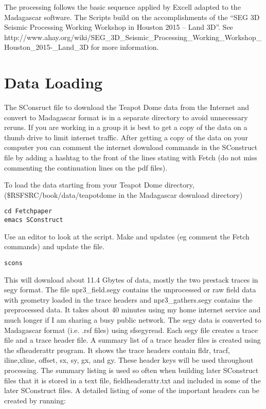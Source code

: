 The processing follows the basic sequence applied by Excell adapted to the Madagascar software.  The Scripts build on the accomplishments of the “SEG 3D Seismic Processing Working Workshop in Houston 2015 – Land 3D”.  See http://www.ahay.org/wiki/SEG\_3D\_Seismic\_Processing\_Working\_Workshop\_Houston\_2015-\_Land\_3D for more information.

\section{Data Loading}
The SConsruct file to download the Teapot Dome data from the Internet and convert to Madagascar format is in a separate directory to avoid unnecessary reruns.  If you are working in a group it is best to get a copy of the data on a thumb drive to limit internet traffic.  After getting a copy of the data on your computer you can comment the internet download commands in the SConstruct file by adding a hashtag to the front of the lines stating with Fetch (do not miss commenting the continuation lines on the pdf files).

To load the data starting from your Teapot Dome directory, (\$RSFSRC/book/data/teapotdome in the Madagascar download directory)

\begin{verbatim}
cd Fetchpaper
emacs SConstruct
\end{verbatim}  

Use an editor to look at the script.  Make and updates (eg comment the Fetch
commands) and update the file.

\begin{verbatim}
scons 
\end{verbatim}  

This will download about 11.4 Gbytes of data, mostly the two prestack traces in segy format.  The file npr3\_field.segy contains the unprocessed or raw field data with geometry loaded in the trace headers and npr3\_gathers.segy contains the preprocessed data.  It takes about 40 minutes using my home internet service and much longer if I am sharing a busy public network.   The segy data is converted to Madagascar format (i.e. .rsf files) using sfsegyread.  Each segy file creates a trace file and a trace header file.  A summary list of a trace header files is created using the sfheaderattr program.  It shows the trace headers contain fldr, tracf, iline,xline, offset, sx, sy, gx, and gy.  These header keys will be used throughout processing.  The summary listing is used so often when building later SConstruct files that it is stored in a text file, fieldheaderattr.txt and included in some of the later SConstruct files.  A detailed listing of some of the important headers can be created by running:

